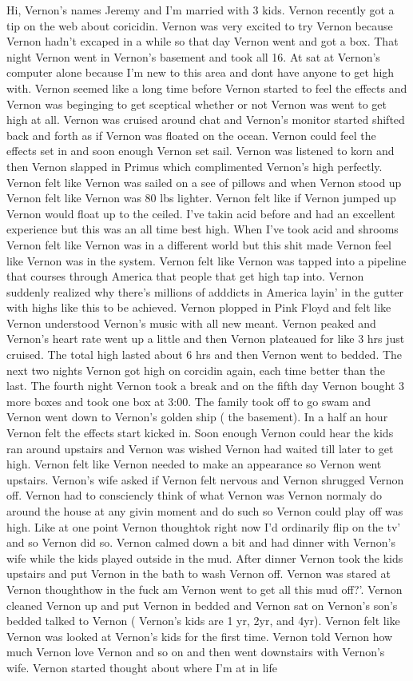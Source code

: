 \documentclass[12pt]{book}
\begin{document}
Hi, Vernon's names Jeremy and I'm married with 3 kids. Vernon recently got a tip on the web about coricidin. Vernon was very excited to try Vernon because Vernon hadn't excaped in a while so that day Vernon went and got a box. That night Vernon went in Vernon's basement and took all 16. At sat at Vernon's computer alone because I'm new to this area and dont have anyone to get high with. Vernon seemed like a long time before Vernon started to feel the effects and Vernon was beginging to get sceptical whether or not Vernon was went to get high at all. Vernon was cruised around chat and Vernon's monitor started shifted back and forth as if Vernon was floated on the ocean. Vernon could feel the effects set in and soon enough Vernon set sail. Vernon was listened to korn and then Vernon slapped in Primus which complimented Vernon's high perfectly. Vernon felt like Vernon was sailed on a see of pillows and when Vernon stood up Vernon felt like Vernon was 80 lbs lighter. Vernon felt like if Vernon jumped up Vernon would float up to the ceiled. I've takin acid before and had an excellent experience but this was an all time best high. When I've took acid and shrooms Vernon felt like Vernon was in a different world but this shit made Vernon feel like Vernon was in the system. Vernon felt like Vernon was tapped into a pipeline that courses through America that people that get high tap into. Vernon suddenly realized why there's millions of adddicts in America layin' in the gutter with highs like this to be achieved. Vernon plopped in Pink Floyd and felt like Vernon understood Vernon's music with all new meant. Vernon peaked and Vernon's heart rate went up a little and then Vernon plateaued for like 3 hrs just cruised. The total high lasted about 6 hrs and then Vernon went to bedded. The next two nights Vernon got high on corcidin again, each time better than the last. The fourth night Vernon took a break and on the fifth day Vernon bought 3 more boxes and took one box at 3:00. The family took off to go swam and Vernon went down to Vernon's golden ship ( the basement). In a half an hour Vernon felt the effects start kicked in. Soon enough Vernon could hear the kids ran around upstairs and Vernon was wished Vernon had waited till later to get high. Vernon felt like Vernon needed to make an appearance so Vernon went upstairs. Vernon's wife asked if Vernon felt nervous and Vernon shrugged Vernon off. Vernon had to consciencly think of what Vernon was Vernon normaly do around the house at any givin moment and do such so Vernon could play off was high. Like at one point Vernon thoughtok right now I'd ordinarily flip on the tv' and so Vernon did so. Vernon calmed down a bit and had dinner with Vernon's wife while the kids played outside in the mud. After dinner Vernon took the kids upstairs and put Vernon in the bath to wash Vernon off. Vernon was stared at Vernon thoughthow in the fuck am Vernon went to get all this mud off?'. Vernon cleaned Vernon up and put Vernon in bedded and Vernon sat on Vernon's son's bedded talked to Vernon ( Vernon's kids are 1 yr, 2yr, and 4yr). Vernon felt like Vernon was looked at Vernon's kids for the first time. Vernon told Vernon how much Vernon love Vernon and so on and then went downstairs with Vernon's wife. Vernon started thought about where I'm at in life 
\end{document}
